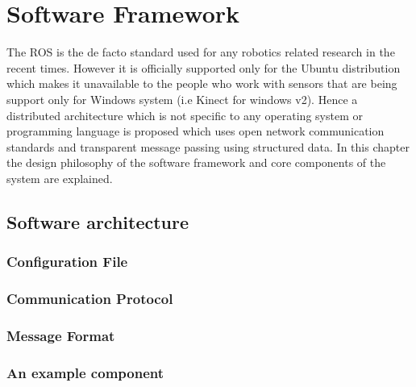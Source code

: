 
\chapter{Software Framework} %

\label{Chapter4} %

		The ROS\cite{quigley2009ros} is the de facto standard used for any robotics related research in the recent times. However it is officially supported only for the Ubuntu distribution which makes it unavailable to the people who work with sensors that are being support only for Windows system (i.e Kinect for windows v2). Hence a distributed architecture which is not specific to any operating system or programming language is proposed which uses open network communication standards and transparent message passing using structured data. In this chapter the design philosophy of the software framework and core components of the system are explained.
		
\section{Software architecture}

\subsection{Configuration File}
\subsection{Communication Protocol}

\subsection{Message Format}

\subsection{An example component}